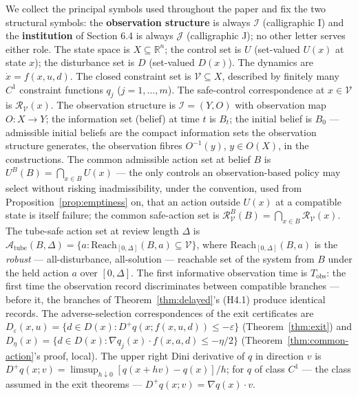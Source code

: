 \documentclass[10pt,twocolumn]{article}
\theoremstyle{definition}
\begin{document}
We collect the principal symbols used throughout the paper and fix the two structural symbols: the \textbf{observation structure} is always
\(\mathcal{I}\) (calligraphic I) and the \textbf{institution} of Section
6.4 is always \(\mathcal{J}\) (calligraphic J); no other letter serves either role. The state space is \(X \subseteq \mathbb{R}^n\); the
control set is \(U\) (set-valued \(U(x)\) at state \(x\)); the
disturbance set is \(D\) (set-valued \(D(x)\)). The dynamics are
\(\dot x = f(x,u,d)\). The closed constraint set is
\(\mathcal{V} \subseteq X\), described by finitely many \(C^1\)
constraint functions \(q_j\) (\(j = 1,\ldots,m\)). The safe-control
correspondence at \(x \in \mathcal{V}\) is
\(\mathcal{R}_{\mathcal{V}}(x)\). The observation structure is
\(\mathcal{I} = (Y, O)\) with observation map \(O : X \to Y\); the
information set (belief) at time \(t\) is \(B_t\); the initial belief is
\(B_0\) --- admissible initial beliefs are the compact information sets
the observation structure generates, the observation fibres
\(O^{-1}(y)\), \(y \in O(X)\), in the constructions. The common
admissible action set at belief \(B\) is
\(U^B(B) = \bigcap_{x \in B} U(x)\) --- the only controls an
observation-based policy may select without risking inadmissibility,
under the convention, used from Proposition~\ref{prop:emptiness} on, that an action outside
\(U(x)\) at a compatible state is itself failure; the common safe-action
set is
\(\mathcal{R}_{\mathcal{V}}^B(B) = \bigcap_{x \in B} \mathcal{R}_{\mathcal{V}}(x)\).
The tube-safe action set at review length \(\Delta\) is
\(\mathcal{A}_{\mathrm{tube}}(B, \Delta) = \{ a : \mathrm{Reach}_{[0,\Delta]}(B, a) \subseteq \mathcal{V} \}\),
where \(\mathrm{Reach}_{[0,\Delta]}(B, a)\) is the \emph{robust} ---
all-disturbance, all-solution --- reachable set of the system from \(B\) under the
held action \(a\) over \([0,\Delta]\). The first informative observation
time is \(T_{\mathrm{obs}}\): the first time the observation record
discriminates between compatible branches --- before it, the branches of
Theorem~\ref{thm:delayed}'s (H4.1) produce identical records. The adverse-selection
correspondences of the exit certificates are
\(D_{\varepsilon}(x,u) = \{ d \in D(x) : D^+ q(x; f(x,u,d)) \le -\varepsilon \}\)
(Theorem~\ref{thm:exit}) and
\(D_{\eta}(x) = \{ d \in D(x) : \nabla q_j(x) \cdot f(x, a, d) \le -\eta/2 \}\)
(Theorem~\ref{thm:common-action}'s proof, local). The upper
right Dini derivative of \(q\) in direction \(v\) is
\(D^+ q(x; v) = \limsup_{h \downarrow 0} [q(x + hv) - q(x)]/h\); for
\(q\) of class \(C^1\) --- the class assumed in the exit theorems ---
\(D^+ q(x; v) = \nabla q(x) \cdot v\).
\end{document}
